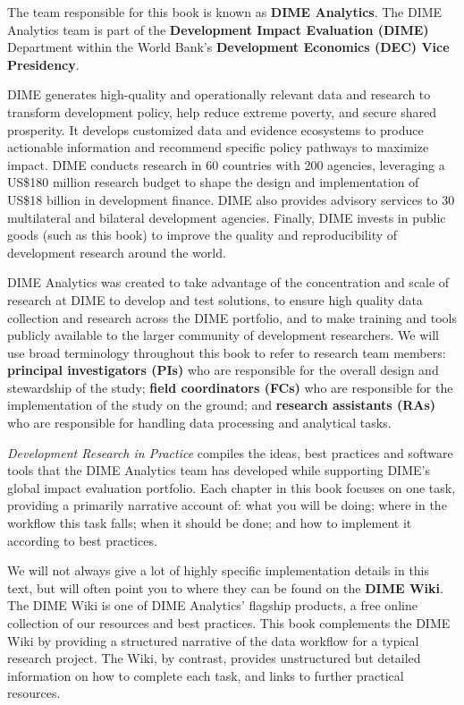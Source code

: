 The team responsible for this book is known as \textbf{DIME Analytics}.
The DIME Analytics team is part of the \textbf{Development Impact Evaluation (DIME)} Department
within the World Bank's \textbf{Development Economics (DEC) Vice Presidency}.

DIME generates high-quality and operationally relevant data and research
to transform development policy, help reduce extreme poverty, and secure shared prosperity.
It develops customized data and evidence ecosystems to produce actionable information
and recommend specific policy pathways to maximize impact.
DIME conducts research in 60 countries with 200 agencies, leveraging a
US\$180 million research budget to shape the design and implementation of
US\$18 billion in development finance.
DIME also provides advisory services to 30 multilateral and bilateral development agencies.
Finally, DIME invests in public goods (such as this book) to improve the quality and reproducibility of development research around the world.

DIME Analytics was created to take advantage of the concentration and scale of research at DIME to develop and test solutions,
to ensure high quality data collection and research across the DIME portfolio,
and to make training and tools publicly available to the larger community of development researchers.
We will use broad terminology throughout this book to refer to research team members:
\textbf{principal investigators (PIs)} who are responsible for
the overall design and stewardship of the study;
\textbf{field coordinators (FCs)} who are responsible for
the implementation of the study on the ground;
and \textbf{research assistants (RAs)} who are responsible for
handling data processing and analytical tasks.

\textit{Development Research in Practice} compiles the ideas, best practices and software tools
that the DIME Analytics team
has developed while supporting DIME's global impact evaluation portfolio.
Each chapter in this book focuses on one task, providing a primarily narrative account of:
what you will be doing; where in the workflow this task falls;
when it should be done; and how to implement it according to best practices.

We will not always give a lot of highly specific implementation details in this text,
but will often point you to where they can be found on the \textbf{DIME Wiki}.
The DIME Wiki is one of DIME Analytics' flagship products,
a free online collection of our resources and best practices.
This book complements the DIME Wiki by providing a structured narrative
of the data workflow for a typical research project.
The Wiki, by contrast, provides unstructured but detailed information
on how to complete each task, and links to further practical resources.

